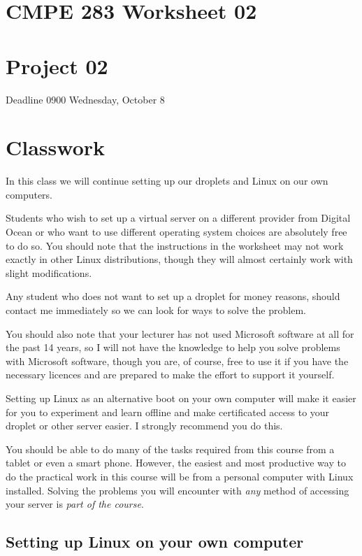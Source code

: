 \documentclass[12pt, a4paper]{article}
\begin{document}

\section*{CMPE 283 Worksheet 02}
\section*{Project 02} 
Deadline 0900 Wednesday, October 8

\section*{Classwork}
In this class we will continue setting up our droplets and Linux on our own 
computers.

Students who wish to set up a virtual server on a different provider from 
Digital Ocean or who want to use different operating system choices are 
absolutely free to do so. You should note that the instructions in the worksheet may not work exactly in other Linux distributions, though they will almost certainly work with slight modifications.

Any student who does not want to set up a droplet for money reasons, should contact me immediately so we can look for ways to solve the problem. 

You should also note that your lecturer has not used Microsoft software at all for the past 14 years, so I will not have the knowledge to help you solve problems with Microsoft software, though you are, of course, free to use it if you have the necessary licences and are prepared to make the effort to support it yourself. 

Setting up Linux as an alternative boot on your own computer will make it easier for you to experiment and learn offline and make certificated access to your droplet or other server easier. I strongly recommend you do this.

You should be able to do many of the tasks required from this course from a tablet or even a smart phone. However, the easiest and most productive way to do the practical work in this course will be from a personal computer with Linux installed. Solving the problems you will encounter with \emph{any} method of accessing your server is \emph{part of the course}.

\subsection*{Setting up Linux on your own computer}
\end{document}
